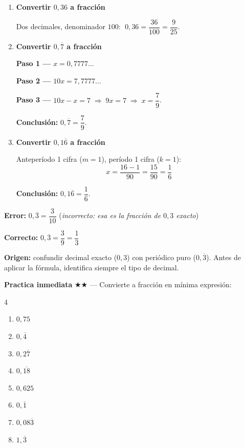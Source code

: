 \documentclass[11pt, letterpaper]{article}
\begin{document}
\begin{tcolorbox}[examplebox, title={Ejemplos --- convertir decimal a fracci\'on}]
\begin{enumerate}[label=\textbf{Ej. \arabic*.}, leftmargin=*, itemsep=14pt]

\item \textbf{Convertir $0{,}36$ a fracci\'on}

Dos decimales, denominador $100$: $\;0{,}36 = \dfrac{36}{100} = \dfrac{9}{25}$. \checkmark

\item \textbf{Convertir $0{,}\overline{7}$ a fracci\'on}

\textbf{Paso 1 ---} $x = 0{,}7777\ldots$

\textbf{Paso 2 ---} $10x = 7{,}7777\ldots$

\textbf{Paso 3 ---} $10x - x = 7 \;\Rightarrow\; 9x = 7 \;\Rightarrow\; x = \dfrac{7}{9}$.

\textbf{Conclusi\'on:} $0{,}\overline{7} = \dfrac{7}{9}$. \checkmark

\item \textbf{Convertir $0{,}1\overline{6}$ a fracci\'on}

Anteper\'iodo 1 cifra ($m=1$), per\'iodo 1 cifra ($k=1$):
$$x = \frac{16 - 1}{90} = \frac{15}{90} = \frac{1}{6}$$

\textbf{Conclusi\'on:} $0{,}1\overline{6} = \dfrac{1}{6}$. \checkmark

\end{enumerate}
\end{tcolorbox}

\begin{tcolorbox}[warningbox, title={Error frecuente --- confundir tipos de decimal}]
\noindent\textbf{Error:} $0{,}\overline{3} = \dfrac{3}{10}$ \quad (\textit{incorrecto: esa es la fracci\'on de $0{,}3$ exacto})

\medskip

\noindent\textbf{Correcto:} $0{,}\overline{3} = \dfrac{3}{9} = \dfrac{1}{3}$

\medskip

\noindent\textbf{Origen:} confundir decimal exacto ($0{,}3$) con peri\'odico puro ($0{,}\overline{3}$). Antes de aplicar la f\'ormula, identifica siempre el tipo de decimal.
\end{tcolorbox}

\medskip
\textbf{Practica inmediata} \quad $\bigstar\bigstar$ --- Convierte a fracci\'on en m\'inima expresi\'on:
\begin{multicols}{4}
\begin{enumerate}[label=\alph*), leftmargin=*]
  \item $0{,}75$
  \item $0{,}\overline{4}$
  \item $0{,}2\overline{7}$
  \item $0{,}\overline{18}$
  \item $0{,}625$
  \item $0{,}\overline{1}$
  \item $0{,}08\overline{3}$
  \item $1{,}\overline{3}$
\end{enumerate}
\end{multicols}
\end{document}
